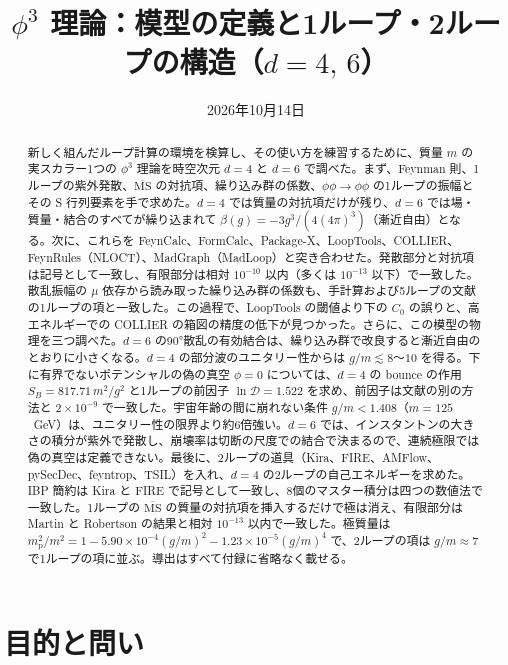 \documentclass[a4paper,10pt]{ltjsarticle}
\title{$\phi^3$ 理論：模型の定義と1ループ・2ループの構造（$d=4,\,6$）}
\author{}
\date{2026年10月14日}
\begin{document}
\maketitle

\begin{abstract}
新しく組んだループ計算の環境を検算し、その使い方を練習するために、質量 $m$ の実スカラー1つの $\phi^3$ 理論を時空次元 $d=4$ と $d=6$ で調べた。まず、Feynman 則、1ループの紫外発散、$\overline{\mathrm{MS}}$ の対抗項、繰り込み群の係数、$\phi\phi\to\phi\phi$ の1ループの振幅とその S 行列要素を手で求めた。$d=4$ では質量の対抗項だけが残り、$d=6$ では場・質量・結合のすべてが繰り込まれて $\beta(g)=-3g^3/(4(4\pi)^3)$（漸近自由）となる。次に、これらを FeynCalc、FormCalc、Package-X、LoopTools、COLLIER、FeynRules（NLOCT）、MadGraph（MadLoop）と突き合わせた。発散部分と対抗項は記号として一致し、有限部分は相対 $10^{-10}$ 以内（多くは $10^{-13}$ 以下）で一致した。散乱振幅の $\mu$ 依存から読み取った繰り込み群の係数も、手計算および5ループの文献の1ループの項と一致した。この過程で、LoopTools の閾値より下の $C_0$ の誤りと、高エネルギーでの COLLIER の箱図の精度の低下が見つかった。さらに、この模型の物理を三つ調べた。$d=6$ の90°散乱の有効結合は、繰り込み群で改良すると漸近自由のとおりに小さくなる。$d=4$ の部分波のユニタリー性からは $g/m\lesssim8$〜$10$ を得る。下に有界でないポテンシャルの偽の真空 $\phi=0$ については、$d=4$ の bounce の作用 $S_B=817.71\,m^2/g^2$ と1ループの前因子 $\ln\mathcal D=1.522$ を求め、前因子は文献の別の方法と $2\times10^{-9}$ で一致した。宇宙年齢の間に崩れない条件 $g/m<1.408$（$m=125$~GeV）は、ユニタリー性の限界より約6倍強い。$d=6$ では、インスタントンの大きさの積分が紫外で発散し、崩壊率は切断の尺度での結合で決まるので、連続極限では偽の真空は定義できない。最後に、2ループの道具（Kira、FIRE、AMFlow、pySecDec、feyntrop、TSIL）を入れ、$d=4$ の2ループの自己エネルギーを求めた。IBP 簡約は Kira と FIRE で記号として一致し、8個のマスター積分は四つの数値法で一致した。1ループの $\overline{\mathrm{MS}}$ の質量の対抗項を挿入するだけで極は消え、有限部分は Martin と Robertson の結果と相対 $10^{-13}$ 以内で一致した。極質量は $m_{\mathrm p}^2/m^2=1-5.90\times10^{-4}(g/m)^2-1.23\times10^{-5}(g/m)^4$ で、2ループの項は $g/m\approx7$ で1ループの項に並ぶ。導出はすべて付録に省略なく載せる。
\end{abstract}

\tableofcontents

\section{目的と問い}\label{sec:intro}
\end{document}
